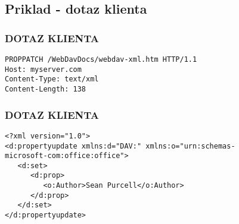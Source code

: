 \documentclass{beamer}
\begin{document}
\subsection{Priklad - dotaz klienta}
\begin{frame}[fragile] %
\frametitle{DOTAZ KLIENTA}
\begin{example}
\begin{verbatim}
PROPPATCH /WebDavDocs/webdav-xml.htm HTTP/1.1
Host: myserver.com
Content-Type: text/xml
Content-Length: 138
   \end{verbatim}
\end{example}
\end{frame}

\begin{frame}[fragile] %
\frametitle{DOTAZ KLIENTA}
\begin{example}
\begin{verbatim}
<?xml version="1.0">
<d:propertyupdate xmlns:d="DAV:" xmlns:o="urn:schemas-
microsoft-com:office:office">
   <d:set>
      <d:prop>
         <o:Author>Sean Purcell</o:Author>
      </d:prop>
   </d:set>
</d:propertyupdate>
   \end{verbatim}
\end{example}
\end{frame}
\end{document}
